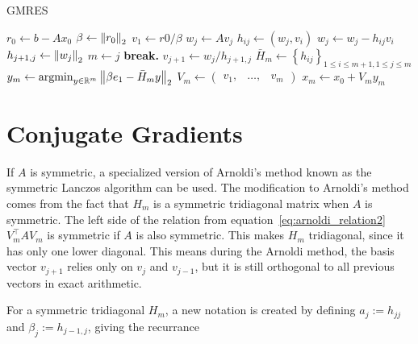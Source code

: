 \begin{algorithm}
	\caption{GMRES}\label{alg:gmres}
	\begin{algorithmic}[1]
            \State $r_0 \gets b-Ax_0$
            \State $\beta \gets \left\lVert r_0\right\rVert_2$
            \State $v_1 \gets r0/\beta$
              \label{alg:gmres_arnoldi}
                \State $w_j \gets A v_j$
                    \State $h_{ij} \gets \left(w_j, v_i\right)$
                    \State $w_j \gets w_j - h_{ij}v_i$
                \EndFor
                \State $h_{j+1, j} \gets \left\lVert w_j\right\rVert_2$
                    \State $m \gets j$
                    \State \textbf{break.}
                \EndIf
                \State $v_{j+1} \gets w_j/h_{j+1, j}$
            \EndFor
            \State $\bar{H}_m \gets \left\{h_{ij}\right\}_{1 \leq i \leq m+1, 1\leq j \leq m}$ 
            \State $y_m  \gets \operatorname*{argmin}_{y \in \mathbb{R}^m} \left\lVert\beta e_1 - \bar{H}_m y\right\rVert_2$ 
            \State $V_m \gets \begin{pmatrix}
                v_1, & \ldots, & v_m
            \end{pmatrix}$ 
            \State $x_m \gets x_0 + V_m y_m$
		\EndProcedure
	\end{algorithmic}
\end{algorithm}

\section{Conjugate Gradients}
If $A$ is symmetric, a specialized version of Arnoldi's method known as the symmetric Lanczos algorithm can be used. The modification to Arnoldi's method comes from the fact that $H_m$ is a symmetric tridiagonal matrix when $A$ is symmetric. The left side of the relation from equation~\ref{eq:arnoldi_relation2} $V^\top_m A V_m$ is symmetric if $A$ is also symmetric. This makes $H_m$ tridiagonal, since it has only one lower diagonal. This means during the Arnoldi method, the basis vector $v_{j+1}$ relies only on $v_j$ and $v_{j-1}$, but it is still orthogonal to all previous vectors in exact arithmetic.

For a symmetric tridiagonal $H_m$, a new notation is created by defining $a_j := h_{jj}$ and $\beta_j := h_{j-1, j}$, giving the recurrance

